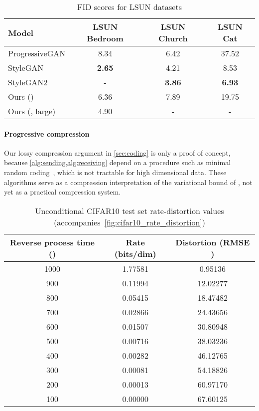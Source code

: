 \documentclass{article}
\begin{document}
\begin{table}[h]
\centering
\caption{FID scores for LSUN  datasets}
\label{table:lsun_fid}
\begin{tabular}{@{}lccc@{}}
\toprule
Model                        & LSUN Bedroom &  LSUN Church & LSUN Cat \\ \midrule
ProgressiveGAN \cite{karras2018progressive} & 8.34 & 6.42 & 37.52 \\
StyleGAN \cite{karras2019style} & \textbf{2.65} & 4.21\rlap{}  & 8.53\rlap{}\\
StyleGAN2 \cite{karras2019analyzing} & - & \textbf{3.86} & \textbf{6.93} \\ \midrule 
Ours () & 6.36 & 7.89 & 19.75 \\
Ours (, large) & 4.90 & - & - \\ \bottomrule
\end{tabular}
\end{table}

\paragraph{Progressive compression}
Our lossy compression argument in \cref{sec:coding} is only a proof of concept, because \cref{alg:sending,alg:receiving} depend on a procedure such as minimal random coding~\citep{havasi2018minimal}, which is not tractable for high dimensional data. These algorithms serve as a compression interpretation of the variational bound  of \citet{sohl2015deep}, not yet as a practical compression system.

\begin{table}[h]
\centering
\caption{Unconditional CIFAR10 test set rate-distortion values  (accompanies~\cref{fig:cifar10_rate_distortion})}
\label{table:cifar10_rate_distortion_table}
\begin{tabular}{ccc}
\toprule
Reverse process time () & Rate (bits/dim) & Distortion (RMSE ) \\
\midrule
1000 & 1.77581 & 0.95136 \\
900 & 0.11994 & 12.02277 \\
800 & 0.05415 & 18.47482 \\
700 & 0.02866 & 24.43656 \\
600 & 0.01507 & 30.80948 \\
500 & 0.00716 & 38.03236 \\
400 & 0.00282 & 46.12765 \\
300 & 0.00081 & 54.18826 \\
200 & 0.00013 & 60.97170 \\
100 & 0.00000 & 67.60125 \\
\bottomrule
\end{tabular}
\end{table}
\end{document}
